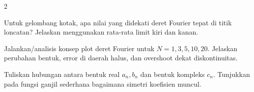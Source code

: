 \documentclass[10pt,a4paper]{article}
\newcommand{\level}[1]{\colorbox{levelbg}{\scriptsize\strut #1}}
\newcommand{\src}[1]{\colorbox{sourcebg}{\scriptsize\strut #1}}
\begin{document}
\begin{multicols}{2}
\begin{qbox}[title={M6.8: Nilai di titik diskontinu\hfill \level{L3}\;\src{Var}}]
\small Untuk gelombang kotak, apa nilai yang didekati deret Fourier tepat di titik loncatan? Jelaskan menggunakan rata-rata limit kiri dan kanan.
\end{qbox}
\begin{qbox}[title={M6.9: Jumlah harmonik\hfill \level{L2}\;\src{PR}}]
\small Jalankan/analisis konsep plot deret Fourier untuk $N=1,3,5,10,20$. Jelaskan perubahan bentuk, error di daerah halus, dan overshoot dekat diskontinuitas.
\end{qbox}
\begin{qbox}[title={M6.10: Koefisien kompleks\hfill \level{L4}\;\src{Var}}]
\small Tuliskan hubungan antara bentuk real $a_n,b_n$ dan bentuk kompleks $c_n$. Tunjukkan pada fungsi ganjil sederhana bagaimana simetri koefisien muncul.
\end{qbox}
\end{multicols}
\newpage
\end{document}
